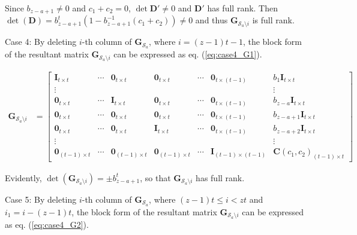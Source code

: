 \documentclass[journal,twocolumn]{IEEEtran}
\theoremstyle{definition}
\newcommand{\calS}{\mathcal{S}}
\newcommand{\bfG}{\mathbf{G}}
\newcommand{\bfI}{\mathbf{I}}
\newcommand{\bfC}{\mathbf{C}}
\newcommand{\bfD}{\mathbf{D}}
\newcommand{\bfzr}{\mathbf{0}}
\begin{document}
\begin{itemize}
	Since $b_{z-a+1}\neq 0$ and $c_1+c_2=0$, $\det \bfD'\neq 0$ and $\bfD'$ has full rank. Then $\det(\bfD)=b_{z-a+1}^t(1-b_{z-a+1}^{-1}(c_1+c_2))\neq 0$ and  thus $\bfG_{\calS_a\setminus i}$ is full rank.
	
	
	Case 4: By deleting $i$-th column of $\bfG_{\calS_a}$, where $i=(z-1)t-1$, the block form of the resultant matrix $\bfG_{\calS_a \setminus i}$ can be expressed as eq. (\ref{eq:case4_G1}).
	\begin{table*}[t]\begin{align}
		\bfG_{\calS_a\setminus i}&=
		\begin{bmatrix}
			\bfI_{t\times t}& \cdots& \bfzr_{t\times t} &\bfzr_{t\times t} &\cdots&\bfzr_{t\times (t-1)}&{b_1}\bfI_{t\times t}\\
			\vdots&&&&&&\vdots\\
			\bfzr_{t\times t}& \cdots& \bfI_{t\times t} &\bfzr_{t\times t} &\cdots&\bfzr_{t\times (t-1)}&{b_{z-a}}\bfI_{t\times t}\\
			\bfzr_{t\times t}& \cdots& \bfzr_{t\times t} &\bfzr_{t\times t} &\cdots&\bfzr_{t\times (t-1)}&{b_{z-a+1}}\bfI_{t\times t}\\
			\bfzr_{t\times t}& \cdots& \bfzr_{t\times t} &\bfI_{t\times t} &\cdots&\bfzr_{t\times (t-1)}&{b_{z-a+2}}\bfI_{t\times t}\\
			\vdots&&&&&&\vdots\\
			\bfzr_{(t-1)\times t}& \cdots& \bfzr_{(t-1)\times t} &\bfzr_{(t-1)\times t} &\cdots&\bfI_{(t-1)\times (t-1)}&\bfC(c_1, c_2)_{(t-1)\times t}
		\end{bmatrix}
			\label{eq:case4_G1}
	\end{align}
	\end{table*}
   Evidently, $\det(\bfG_{\calS_a\setminus i})= \pm b_{z-a+1}^t$, so that $\bfG_{\calS_a\setminus i}$  has full rank.
	
	Case 5: By deleting $i$-th column of $\bfG_{\calS_a}$, where $(z-1)t\le i<zt$ and $i_1=i-(z-1)t$, the block form of the resultant matrix $\bfG_{\calS_a \setminus i}$ can be expressed as eq. (\ref{eq:case4_G2}).
	

\end{itemize}
\end{document}
